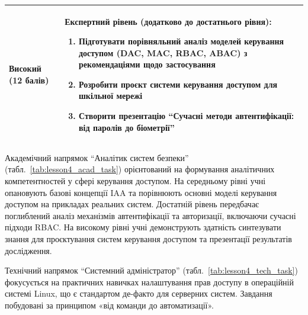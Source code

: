 \begin{table}[h!]
\begin{tabular}{
  | >{\raggedright\arraybackslash}p{} 
  | >{\raggedright\arraybackslash}p{} |
}
\textbf{Високий} (12 балів)&
\textbf{Експертний рівень (додатково до достатнього рівня):}
\begin{enumerate}
    \item Підготувати порівняльний аналіз моделей керування доступом (DAC, MAC, RBAC, ABAC) з рекомендаціями щодо застосування
    \item Розробити проєкт системи керування доступом для шкільної мережі
    \item Створити презентацію ``Сучасні методи автентифікації: від паролів до біометрії''
\end{enumerate} \\ \hline
\end{tabular}
\end{table}

Академічний напрямок ``Аналітик систем безпеки'' (табл.~\ref{tab:lesson4_acad_task}) орієнтований на формування аналітичних компетентностей у сфері керування доступом. На середньому рівні учні опановують базові концепції IAA та порівнюють основні моделі керування доступом на прикладах реальних систем. Достатній рівень передбачає поглиблений аналіз механізмів автентифікації та авторизації, включаючи сучасні підходи RBAC. На високому рівні учні демонструють здатність синтезувати знання для проєктування систем керування доступом та презентації результатів дослідження.

Технічний напрямок ``Системний адміністратор'' (табл.~\ref{tab:lesson4_tech_task}) фокусується на практичних навичках налаштування прав доступу в операційній системі Linux, що є стандартом де-факто для серверних систем. Завдання побудовані за принципом «від команди до автоматизації».



